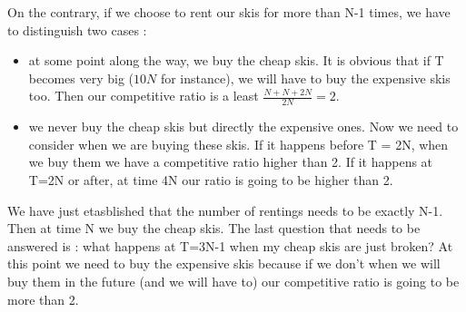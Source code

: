 On the contrary, if we choose to rent our skis for more than N-1 times, we have to distinguish two cases :
\begin{itemize}
	\item at some point along the way, we buy the cheap skis. It is obvious that if T becomes very big ($10N$ for instance), we will have to buy the expensive skis too. Then our competitive ratio is a least $\frac{N+N+2N}{2N}=2$.
	\item we never buy the cheap skis but directly the expensive ones. Now we need to consider when we are buying these skis. If it happens before T = 2N, when we buy them we have a competitive ratio higher than 2. If it happens at T=2N or after, at time 4N our ratio is going to be higher than 2.
\end{itemize}

We have just etasblished that the number of rentings needs to be exactly N-1. Then at time N we buy the cheap skis. The last question that needs to be answered is : what happens at T=3N-1 when my cheap skis are just broken? At this point we need to buy the expensive skis because if we don't when we will buy them in the future (and we will have to) our competitive ratio is going to be more than 2.
